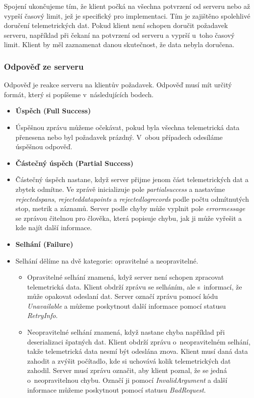 Spojení ukončujeme tím, že klient počká na všechna potvrzení od serveru nebo až vyprší časový limit, jež je specifický pro implementaci. Tím je zajištěno spolehlivé doručení telemetrických dat. Pokud klient není schopen doručit požadavek serveru, například při čekaní na potvrzení od serveru a vyprší u~toho časový limit. Klient by měl zaznamenat danou skutečnost, že data nebyla doručena.

\subsubsection{Odpověď ze serveru}
Odpověď je reakce serveru na klientův požadavek. Odpověď musí mít určitý formát, který si popíšeme v~následujících bodech.
    \begin{itemize}
        \item{\textbf{Úspěch (Full Success)}}
        \item[]
        Úspěšnou zprávu můžeme očekávat, pokud byla všechna telemetrická data přenesena nebo byl požadavek prázdný. V~obou případech odesíláme úspěšnou odpověď.
        \item{\textbf{Částečný úspěch (Partial Success)}}
        \item[]
        Částečný úspěch nastane, když server přijme jenom část telemetrických dat a zbytek odmítne. Ve zprávě inicializuje pole \textit{partial\textunderscore  success} a nastavíme \textit{rejected\textunderscore  spans}, \textit{rejected\textunderscore data\textunderscore points} a \textit{rejected\textunderscore log\textunderscore records} podle počtu odmítnutých stop, metrik a záznamů. Server podle chyby může vyplnit pole \textit{error\textunderscore  message} se zprávou čitelnou pro člověka, která popisuje chybu, jak ji může vyřešit a kde najít další informace.
        \item{\textbf{Selhání (Failure)}}
        \item[]
        Selhání dělíme na dvě kategorie: opravitelné a neopravitelné.
        \begin{itemize}
            \item{Opravitelné selhání znamená, když server není schopen zpracovat telemetrická data. Klient obdrží zprávu se selháním, ale s~informací, že může opakovat odeslaní dat. Server označí zprávu pomocí kódu \textit{Unavailable} a můžeme poskytnout další informace pomocí statusu \textit{RetryInfo}.}
            \item{Neopravitelné selhání znamená, když nastane chyba například při deserializaci špatných dat. Klient obdrží zprávu o~neopravitelném selhání, takže telemetrická data nesmí být odeslána znova. Klient musí daná data zahodit a zvýšit počítadlo, kde si uchovává kolik telemetrických dat zahodil. Server musí zprávu označit, aby klient poznal, že se jedná o~neopravitelnou chybu. Označí ji pomocí \textit{InvalidArgument} a další informace můžeme poskytnout pomocí statusu \textit{BadRequest}.}
        \end{itemize}
    \end{itemize}
